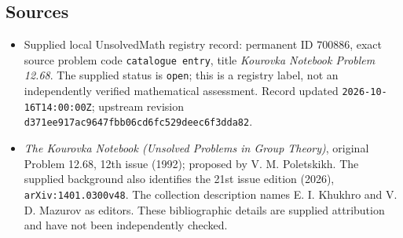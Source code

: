 \documentclass[11pt]{article}
\begin{document}
\subsection{Sources}
\begin{itemize}
\item Supplied local UnsolvedMath registry record: permanent ID \(700886\), exact source problem code \texttt{catalogue entry}, title \emph{Kourovka Notebook Problem 12.68}. The supplied status is \texttt{open}; this is a registry label, not an independently verified mathematical assessment. Record updated \texttt{2026-10-16T14:00:00Z}; upstream revision \texttt{d371ee917ac9647fbb06cd6fc529deec6f3dda82}.
\item \emph{The Kourovka Notebook (Unsolved Problems in Group Theory)}, original Problem 12.68, 12th issue (1992); proposed by V. M. Poletskikh. The supplied background also identifies the 21st issue edition (2026), \texttt{arXiv:1401.0300v48}. The collection description names E. I. Khukhro and V. D. Mazurov as editors. These bibliographic details are supplied attribution and have not been independently checked.
\end{itemize}
\end{document}
